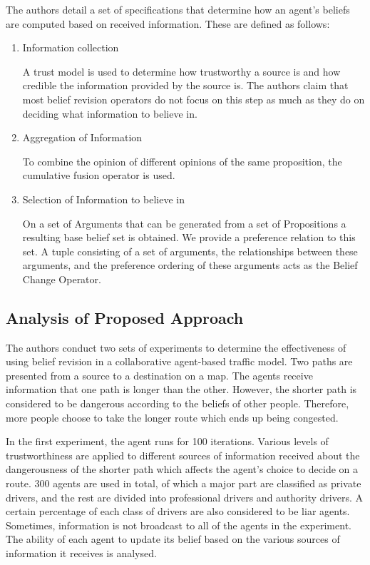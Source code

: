 \documentclass[UTF8]{article}
\begin{document}
The authors detail a set of specifications that determine how an agent's beliefs are computed based on received information. These are defined as follows:

\begin{enumerate}
  \item Information collection
  
  A trust model is used to determine how trustworthy a source is and how credible the information provided by the source is. The authors claim that 
    most belief revision operators do not focus on this step as much as they do on deciding what information to believe in.

  
  \item Aggregation of Information
  
  To combine the opinion of different opinions of the same proposition, the cumulative fusion operator
  is used.

  \item Selection of Information to believe in
  
  On a set of Arguments that can be generated from a set of Propositions a resulting base belief set is obtained. We provide a 
  preference relation to this set. A tuple consisting of a set of arguments, the relationships between these arguments, and the preference ordering 
  of these arguments acts as the Belief Change Operator.

  
\end{enumerate}

\subsection{Analysis of Proposed Approach}
The authors conduct two sets of experiments to determine the effectiveness of using belief revision
in a collaborative agent-based traffic model. Two paths are presented from a source to a destination 
on a map. The agents receive information that one path is longer than the other. However, the shorter 
path is considered to be dangerous according to the beliefs of other people. Therefore, more people choose to
take the longer route which ends up being congested. 

In the first experiment, the agent runs for 100 iterations. Various levels of trustworthiness are applied to different sources
of information received about the dangerousness of the shorter path which affects the agent's choice to 
decide on a route. 300 agents are used in total, of which a major part are classified as private drivers, 
and the rest are divided into professional drivers and authority drivers. A certain percentage of each class 
of drivers are also considered to be liar agents. Sometimes, information is not broadcast to all of the agents in the experiment. The ability of each agent to update its belief based on the 
various sources of information it receives is analysed.
\end{document}

